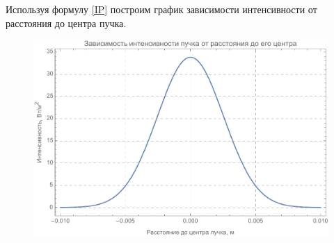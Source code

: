 \documentclass[a4paper,14pt]{extarticle}
\begin{document}
Используя формулу \eqref{IP} построим график зависимости интенсивности от расстояния до центра пучка. 
\begin{figure}[H]
	\includegraphics[scale=0.7]{I(r)}
\end{figure}
\end{document}
